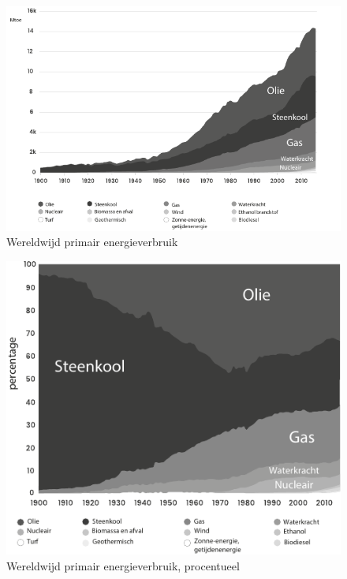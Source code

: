 \begin{figure}[!htb]
\centering
    \includegraphics[width=\textwidth]{figures/fig10.pdf}
\caption[Wereldwijd primair energieverbruik]{Wereldwijd primair energieverbruik\footnotemark}
\label{fig10}
\end{figure}

\begin{figure}[!htb]
\centering
    \includegraphics[width=\textwidth]{figures/fig11.pdf}
\caption[Wereldwijd primair energieverbruik, procentueel]{Wereldwijd primair energieverbruik, procentueel\footnotemark}
\label{fig11}
\end{figure}

